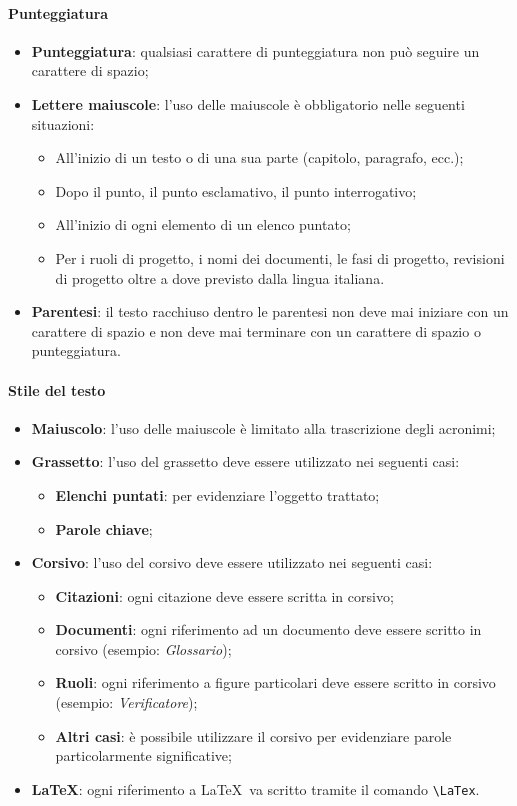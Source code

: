 \paragraph{Punteggiatura}
\begin{itemize}
	\item \textbf{Punteggiatura}: qualsiasi carattere di punteggiatura non può seguire un carattere di spazio;
	\item \textbf{Lettere maiuscole}: l'uso delle maiuscole è obbligatorio nelle seguenti situazioni:
	\begin{itemize}
		\item All'inizio di un  testo o di una sua parte (capitolo, paragrafo, ecc.);
		\item Dopo il punto, il punto esclamativo, il punto interrogativo;
		\item All'inizio di ogni elemento di un elenco puntato;
		\item Per i ruoli di progetto, i nomi dei documenti, le fasi di progetto, revisioni di progetto oltre a dove previsto dalla lingua italiana.
	\end{itemize}
	\item \textbf{Parentesi}: il testo racchiuso dentro le parentesi non deve mai iniziare con un carattere di spazio e non deve mai terminare con un carattere di spazio o punteggiatura.
\end{itemize}	

\newpage
\paragraph{Stile del testo}
\begin{itemize}
	\item \textbf{Maiuscolo}: l'uso delle maiuscole è limitato alla trascrizione degli acronimi;
	\item \textbf{Grassetto}: l'uso del grassetto deve essere utilizzato nei seguenti casi: 
	\begin{itemize}
		\item \textbf{Elenchi puntati}: per evidenziare l'oggetto trattato;
		\item \textbf{Parole chiave};
	\end{itemize}
	\item \textbf{Corsivo}: l'uso del corsivo deve essere utilizzato nei seguenti casi:
	\begin{itemize}
		\item \textbf{Citazioni}: ogni citazione deve essere scritta in corsivo; 
		\item \textbf{Documenti}: ogni riferimento ad un documento deve essere scritto in corsivo (esempio: \textit{Glossario});
		\item \textbf{Ruoli}: ogni riferimento a figure particolari deve essere scritto in corsivo (esempio: \textit{Verificatore});
		\item \textbf{Altri casi}: è possibile utilizzare il corsivo per evidenziare parole particolarmente significative;
	\end{itemize}
	\item \textbf{\LaTeX}: ogni riferimento a \LaTeX\ va scritto tramite il comando \verb|\LaTex|.
\end{itemize}

